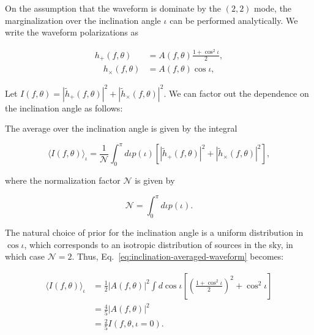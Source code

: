 \documentclass{article}
\begin{document}
On the assumption that the waveform is dominate by the $(2, 2)$ mode, the
marginalization over the inclination angle $\iota$ can be performed
analytically. We write the waveform polarizations as

\begin{equation}
	\begin{aligned}
		h_+(f, \theta)              & = A(f, \theta) \frac{1 + \cos^2\iota}{2}, \\
		\quad h_{\times}(f, \theta) & = A(f, \theta) \cos\iota,
	\end{aligned}
	\label{eq:waveform-polarizations-inclination}
\end{equation}

Let $I(f, \theta) = |\tilde{h}_{+}(f, \theta)|^2 + |\tilde{h}_{\times}(f,
	\theta)|^2$. We can factor out the dependence on the inclination angle as
follows:

The average over the inclination angle is given by the integral

\begin{equation}
	\langle I(f, \theta) \rangle_\iota = \frac{1}{\mathcal{N}} \int_0^\pi d\iota p(\iota) \left[|\tilde{h}_{+}(f, \theta)|^2 + |\tilde{h}_{\times}(f, \theta)|^2\right],
	\label{eq:inclination-averaged-waveform}
\end{equation}

where the normalization factor $\mathcal{N}$ is given by

\begin{equation}
	\mathcal{N} = \int_0^\pi d\iota p(\iota).
	\label{eq:inclination-averaged-waveform-normalization}
\end{equation}

The natural choice of prior for the inclination angle is a uniform distribution
in $\cos \iota$, which corresponds to an isotropic distribution of sources in
the sky, in which case $\mathcal{N} = 2$. Thus,
Eq.~\eqref{eq:inclination-averaged-waveform} becomes:

\begin{align}
	\nonumber
	\langle I(f, \theta) \rangle_\iota & = \frac{1}{2} |A(f, \theta)|^2 \int d\cos\iota \left[ \left(\frac{1 + \cos^2\iota}{2}\right)^2 + \cos^2\iota \right] \\
	\nonumber
	                                   & = \frac{4}{5} |A(f, \theta)|^2                                                                                       \\
	                                   & = \frac{2}{5} I(f, \theta, \iota = 0).
\end{align}
\end{document}
